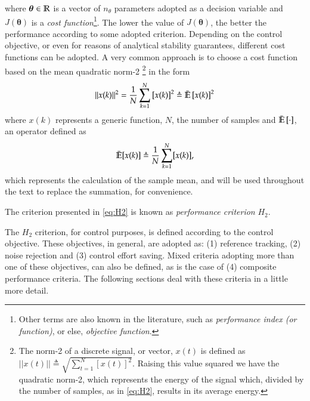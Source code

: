 where $\bm{\theta} \in \mathbb{R}$ is a vector of $n_{\theta}$ parameters adopted as a decision variable and $J(\bm{\theta})$ is a \textit{cost function}\footnote{Other terms are also known in the literature, such as \textit{performance index (or function)}, or else, \textit{objective function}.}. The lower the value of $J(\bm{\theta})$, the better the performance according to some adopted criterion. Depending on the control objective, or even for reasons of analytical stability guarantees, different cost functions can be adopted. A very common approach is to choose a cost function based on the mean quadratic norm-2 \footnote{The norm-2 of a discrete signal, or vector, $x(t)$ is defined as $||x(t)|| \triangleq \sqrt{ \sum_{t=1}^{N} [x(t)]^{2} }$. Raising this value squared we have the quadratic norm-2, which represents the energy of the signal which, divided by the number of samples, as in \eqref{eq:H2}, results in its average energy.}
in the form
\begin{equation}
   ||x(k)||^{2} =\frac{1}{N}\sum_{k=1}^{N} \left[ x(k) \right]^{2} \triangleq \bar{\mathbb{E}} \left[ x(k) \right]^{2}
   \label{eq:H2}
\end{equation}
where $x(k)$ represents a generic function, $N$, the number of samples and $\bar{\mathbb{E}}\left[ \cdot \right] $, an operator defined as
\begin{equation}
   \bar{\mathbb{E}}[x(k)] \triangleq \frac{1}{N}\sum_{k=1}^{N} [x(k)],
\end{equation}
which represents the calculation of the sample mean, and will be used throughout the text to replace the summation, for convenience.

The criterion presented in \eqref{eq:H2} is known as \textit{performance criterion} $H_2$.

The $H_2$ criterion, for control purposes, is defined according to the control objective. These objectives, in general, are adopted as: (1) reference tracking, (2) noise rejection and (3) control effort saving. Mixed criteria adopting more than one of these objectives, can also be defined, as is the case of (4) composite performance criteria. The following sections deal with these criteria in a little more detail.


